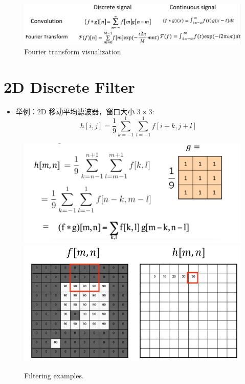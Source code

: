 \begin{figure}[htbp]
    \centering
    \includegraphics[scale=0.18]{figures/FourierTransform.png}
    \caption{Fourier transform visualization.}
\end{figure}

\clearpage

\section{2D Discrete Filter}
\begin{itemize}
    \item 举例：2D 移动平均滤波器，窗口大小 $ 3 \times 3 $:
    $$
    h[i,j] = \frac{1}{9} \sum_{k=-1}^{1} \sum_{l=-1}^{1} f[i+k, j+l]
    $$
\end{itemize}

\begin{figure}[htbp]
    \centering
    \includegraphics[scale=0.25]{figures/g.png}
    \includegraphics[scale=0.25]{figures/g2.png}
    \caption{Filtering examples.}
\end{figure}

